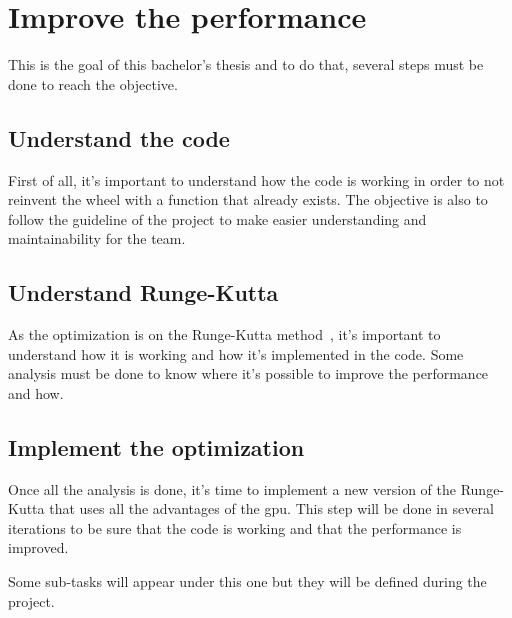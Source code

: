 \section{Improve the performance}
\label{spec:ch:activities:improve-the-performance}

This is the goal of this bachelor's thesis and to do that, several steps must be done to reach the objective.


\subsection{Understand the code}
\label{spec:ch:activities:improve-the-performance:understand-the-code}

First of all, it's important to understand how the code is working in order to not reinvent the wheel with a function that already exists.
The objective is also to follow the guideline of the project to make easier understanding and maintainability for the team.


\subsection{Understand Runge-Kutta}
\label{spec:ch:activities:improve-the-performance:understand-runge-kutta}

As the optimization is on the Runge-Kutta method~\cite{Runge-Kutta-methods}, it's important to understand how it is working and how it's implemented in the code.
Some analysis must be done to know where it's possible to improve the performance and how.


\subsection{Implement the optimization}
\label{spec:ch:activities:improve-the-performance:implement-the-optimization}

Once all the analysis is done, it's time to implement a new version of the Runge-Kutta that uses all the advantages of the \acrshort{gpu}.
This step will be done in several iterations to be sure that the code is working and that the performance is improved.

Some sub-tasks will appear under this one but they will be defined during the project.

